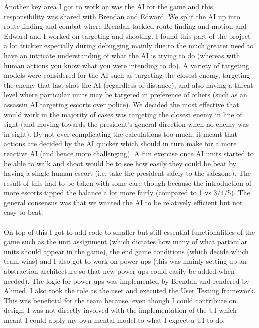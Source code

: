 \documentclass[12pt]{article}
\newcommand{\return}{\\\\\noindent}
\begin{document}
Another key area I got to work on was the AI for the game and this responsibility was shared with Brendan and Edward. We split the AI up into route finding and combat where Brendan tackled route finding and motion and Edward and I worked on targeting and shooting. I found this part of the project a lot trickier especially during debugging mainly due to the much greater need to have an intricate understanding of what the AI is trying to do (whereas with human actions you know what you were intending to do). A variety of targeting models were considered for the AI such as targeting the closest enemy, targeting the enemy that last shot the AI (regardless of distance), and also having a threat level where particular units may be targeted in preference of others (such as an assassin AI targeting escorts over police). We decided the most effective that would work in the majority of cases was targeting the closest enemy in line of sight (and moving towards the president's general direction when no enemy was in sight). By not over-complicating the calculations too much, it meant that actions are decided by the AI quicker which should in turn make for a more reactive AI (and hence more challenging). A fun exercise once AI units started to be able to walk and shoot would be to see how easily they could be beat by having a single human escort (i.e. take the president safely to the safezone). The result of this had to be taken with some care though because the introduction of more escorts tipped the balance a lot more fairly (compared to 1 vs 3/4/5). The general consensus was that we wanted the AI to be relatively efficient but not easy to beat.\return
On top of this I got to add code to smaller but still essential functionalities of the game such as the unit assignment (which dictates how many of what particular units should appear in the game), the end game conditions (which decide which team wins) and I also got to work on power-ups (this was mainly setting up an abstraction architecture so that new power-ups could easily be added when needed). The logic for power-ups was implemented by Brendan and rendered by Ahmed. I also took the role as the user and executed the User Testing framework. This was beneficial for the team because, even though I could contribute on design, I was not directly involved with the implementation of the UI which meant I could apply my own mental model to what I expect a UI to do.
\newpage
\end{document}
